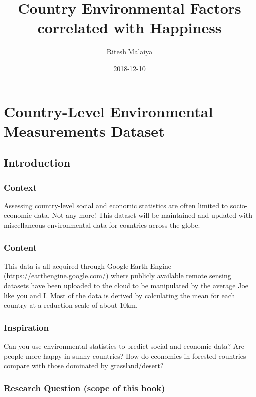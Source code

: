 \documentclass[]{book}
\title{Country Environmental Factors correlated with Happiness}
\author{Ritesh Malaiya}
\date{2018-12-10}
\begin{document}
\maketitle

{
\setcounter{tocdepth}{1}
\tableofcontents
}
\hypertarget{part-country-level-environmental-measurements-dataset}{%
\part{Country-Level Environmental Measurements
Dataset}\label{part-country-level-environmental-measurements-dataset}}

\hypertarget{intro}{%
\chapter{Introduction}\label{intro}}

\hypertarget{context}{%
\section{Context}\label{context}}

Assessing country-level social and economic statistics are often limited
to socio-economic data. Not any more! This dataset will be maintained
and updated with miscellaneous environmental data for countries across
the globe.

\hypertarget{content}{%
\section{Content}\label{content}}

This data is all acquired through Google Earth Engine
(\url{https://earthengine.google.com/}) where publicly available remote
sensing datasets have been uploaded to the cloud to be manipulated by
the average Joe like you and I. Most of the data is derived by
calculating the mean for each country at a reduction scale of about
10km.

\hypertarget{inspiration}{%
\section{Inspiration}\label{inspiration}}

Can you use environmental statistics to predict social and economic
data? Are people more happy in sunny countries? How do economies in
forested countries compare with those dominated by grassland/desert?

\hypertarget{research-question-scope-of-this-book}{%
\section{Research Question (scope of this
book)}\label{research-question-scope-of-this-book}}
\end{document}
